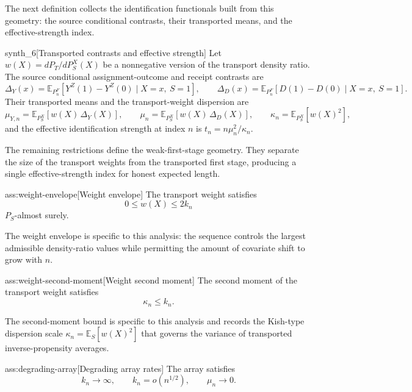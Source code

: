 The next definition collects the identification functionals built from this geometry: the source conditional contrasts, their transported means, and the effective-strength index.

\begin{definitionv}{synth_6}[Transported contrasts and effective strength]
Let \(w(X)=dP_T/dP_S^X(X)\) be a nonnegative version of the transport density ratio.  The source conditional assignment-outcome and receipt contrasts are
\[
\Delta_Y(x)=\mathbb E_{P_n^F}\!\left[Y^Z(1)-Y^Z(0)\mid X=x,\ S=1\right],
\qquad
\Delta_D(x)=\mathbb E_{P_n^F}\!\left[D(1)-D(0)\mid X=x,\ S=1\right].
\]
Their transported means and the transport-weight dispersion are
\[
\mu_{Y,n}=\mathbb E_{P_S^X}\!\left[w(X)\,\Delta_Y(X)\right],
\qquad
\mu_n=\mathbb E_{P_S^X}\!\left[w(X)\,\Delta_D(X)\right],
\qquad
\kappa_n=\mathbb E_{P_S^X}\!\left[w(X)^2\right],
\]
and the effective identification strength at index \(n\) is \(t_n=n\mu_n^2/\kappa_n\).
\end{definitionv}

The remaining restrictions define the weak-first-stage geometry.  They separate the size of the transport weights from the transported first stage, producing a single effective-strength index for honest expected length.

\begin{assumptionv}{ass:weight-envelope}[Weight envelope]
The transport weight satisfies
\[
0 \le w(X) \le 2k_n
\]
\(P_S\)-almost surely.
\end{assumptionv}

The weight envelope is specific to this analysis: the sequence  controls the largest admissible density-ratio values while permitting the amount of covariate shift to grow with \(n\).

\begin{assumptionv}{ass:weight-second-moment}[Weight second moment]
The second moment of the transport weight satisfies
\[
\kappa_n \le k_n .
\]
\end{assumptionv}

The second-moment bound is specific to this analysis and records the Kish-type dispersion scale \(\kappa_n=\mathbb E_S[w(X)^2]\) that governs the variance of transported inverse-propensity averages.

\begin{assumptionv}{ass:degrading-array}[Degrading array rates]
The array satisfies
\[
k_n \to \infty,
\qquad
k_n=o(n^{1/2}),
\qquad
\mu_n\to 0 .
\]
\end{assumptionv}

